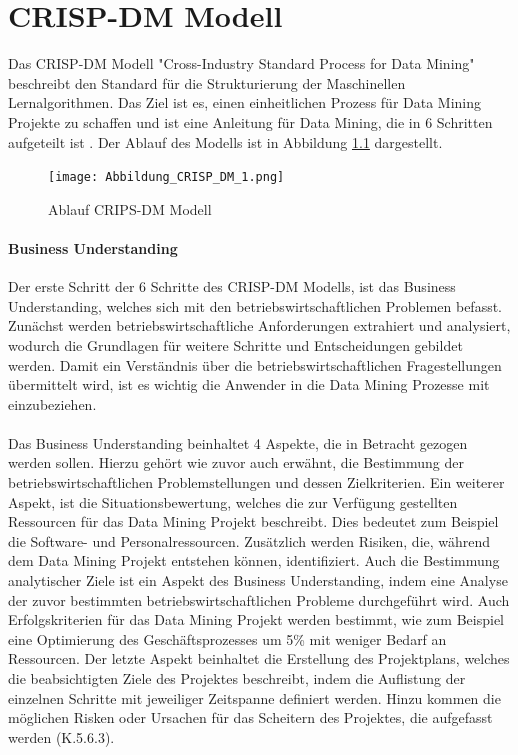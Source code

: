 \documentclass[12pt]{scrreprt}
\begin{document}
\newpage
\chapter{CRISP-DM Modell}
	
Das CRISP-DM Modell "Cross-Industry Standard Process for Data Mining" beschreibt den Standard für die Strukturierung der Maschinellen Lernalgorithmen. Das Ziel ist es, einen einheitlichen Prozess für Data Mining Projekte zu schaffen und ist eine Anleitung für Data Mining, die in 6 Schritten aufgeteilt ist \cite{Wuttke}. Der Ablauf des Modells ist in Abbildung \ref{fig:fig6} dargestellt.
	
	\begin{figure}[h!]
		\centering
		\texttt{[image: Abbildung\_CRISP\_DM\_1.png]}
		\caption{Ablauf CRIPS-DM Modell \cite{Abbildung6}}
		\label{fig:fig6}
	\end{figure}
	
	\subsubsection{Business Understanding}
	
	Der erste Schritt der 6 Schritte des CRISP-DM Modells, ist das Business Understanding, welches sich mit den betriebswirtschaftlichen Problemen befasst. Zunächst werden betriebswirtschaftliche Anforderungen extrahiert und analysiert, wodurch die Grundlagen für weitere Schritte und Entscheidungen gebildet werden. Damit ein Verständnis über die betriebswirtschaftlichen Fragestellungen übermittelt wird, ist es wichtig die Anwender in die Data Mining Prozesse mit einzubeziehen.\\
\\
Das Business Understanding beinhaltet 4 Aspekte, die in Betracht gezogen werden sollen. Hierzu gehört wie zuvor auch erwähnt, die Bestimmung der betriebswirtschaftlichen Problemstellungen und dessen Zielkriterien. Ein weiterer Aspekt, ist die Situationsbewertung, welches die zur Verfügung gestellten Ressourcen für das Data Mining Projekt beschreibt. Dies bedeutet zum Beispiel die Software- und Personalressourcen. Zusätzlich werden Risiken, die, während dem Data Mining Projekt entstehen können, identifiziert. Auch die Bestimmung analytischer Ziele ist ein Aspekt des Business Understanding, indem eine Analyse der zuvor bestimmten betriebswirtschaftlichen Probleme durchgeführt wird. Auch Erfolgskriterien für das Data Mining Projekt werden bestimmt, wie zum Beispiel eine Optimierung des Geschäftsprozesses um 5\% mit weniger Bedarf an Ressourcen. Der letzte Aspekt beinhaltet die Erstellung des Projektplans, welches die beabsichtigten Ziele des Projektes beschreibt, indem die Auflistung der einzelnen Schritte mit jeweiliger Zeitspanne definiert werden. Hinzu kommen die möglichen Risken oder Ursachen für das Scheitern des Projektes, die aufgefasst werden \cite{Burkov2019} (K.5.6.3).
	
\end{document}
